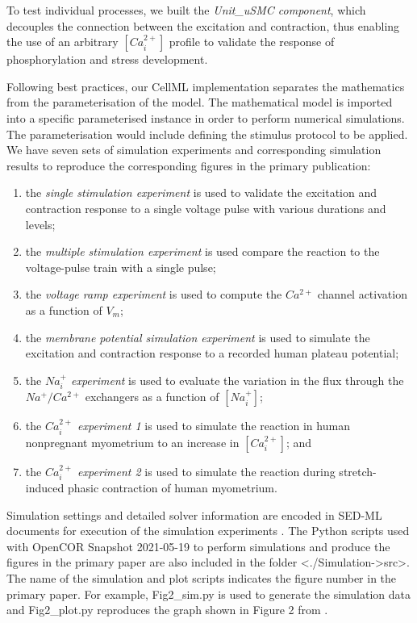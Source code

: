 \documentclass[fleqn,10pt]{physiome}
\begin{document}
To test individual processes, we built the \emph{Unit\_uSMC component}, which decouples the connection between the excitation and contraction, thus enabling the use of an arbitrary $[Ca_{i}^{2+}]$ profile to validate the response of phosphorylation and stress development.  

Following best practices, our CellML implementation separates the mathematics from the parameterisation of the model. The mathematical model is imported into a specific parameterised instance in order to perform numerical simulations. The parameterisation would include defining the stimulus protocol to be applied. We have seven sets of simulation experiments and corresponding simulation results to reproduce the corresponding figures in the primary publication: 
\begin{enumerate}[noitemsep] 
\item the \emph{single stimulation experiment} is used to validate the excitation and contraction response to a single voltage pulse with various durations and levels;
\item the \emph{multiple stimulation experiment} is used compare the reaction to the voltage-pulse train with a single pulse;
\item the \emph{voltage ramp experiment} is used to compute the $Ca^{2+}$ channel activation as a function of $V_m$;
\item the \emph{membrane potential simulation experiment} is used to simulate the excitation and contraction response to a recorded human plateau potential;
\item the \emph{$Na_i^{+}$ experiment} is used to evaluate the variation in the flux through the $Na^{+}/Ca^{2+}$ exchangers as a function of $[Na_i^{+}]$;
\item the \emph{$Ca_{i}^{2+}$ experiment 1} is used to simulate the reaction in human nonpregnant myometrium to an increase in $[Ca_{i}^{2+}]$; and 
\item the \emph{$Ca_{i}^{2+}$ experiment 2} is used to simulate the reaction during stretch-induced phasic contraction of human myometrium.
\end{enumerate}

Simulation settings and detailed solver information are encoded in SED-ML documents for execution of the simulation experiments \citep{waltemath_reproducible_2011}. The Python scripts used with OpenCOR Snapshot 2021-05-19 \citep{garny_opencor_2015} to perform simulations and produce the figures in the primary paper are also included in the folder <./Simulation->src>. The name of the simulation and plot scripts indicates the figure number in the primary paper. For example, Fig2\_sim.py is used to generate the simulation data and Fig2\_plot.py reproduces the graph shown in Figure 2 from \citet{bursztyn2007mathematical}.
\end{document}
